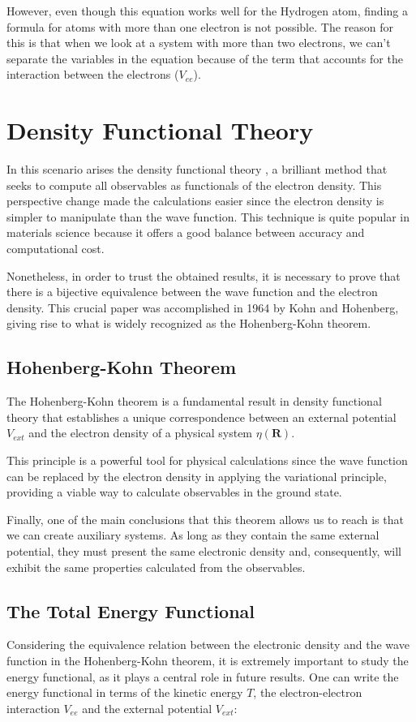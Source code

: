 However, even though this equation works well for the Hydrogen atom, finding a formula for atoms with more than one electron is not possible. The reason for this is that when we look at a system with more than two electrons, we can't separate the variables in the equation because of the term that accounts for the interaction between the electrons ($V_{ee}$).

\section{Density Functional Theory}
In this scenario arises the density functional theory  \cite{PhysRev.136.B864}, a brilliant method that seeks to compute all observables as functionals of the electron density. This perspective change made the calculations easier since the electron density is simpler to manipulate than the wave function. This technique is quite popular in materials science because it offers a good balance between accuracy and computational cost.

Nonetheless, in order to trust the obtained results, it is necessary to prove that there is a bijective equivalence between the wave function and the electron density. This crucial paper was accomplished in 1964 by Kohn and Hohenberg\cite{PhysRev.136.B864}, giving rise to what is widely recognized as the Hohenberg-Kohn theorem.

\subsection{Hohenberg-Kohn Theorem}
The Hohenberg-Kohn theorem \cite{PhysRev.136.B864} is a fundamental result in density functional theory that establishes a unique correspondence between an external potential $V_{ext}$ and the electron density of a physical system $\eta (\textbf{R})$. 

This principle is a powerful tool for physical calculations since the wave function can be replaced by the electron density in applying the variational principle, providing a viable way to calculate observables in the ground state.

Finally, one of the main conclusions that this theorem allows us to reach is that we can create auxiliary systems. As long as they contain the same external potential, they must present the same electronic density and, consequently, will exhibit the same properties calculated from the observables.

\subsection{The Total Energy Functional}
Considering the equivalence relation between the electronic density and the wave function in the Hohenberg-Kohn theorem, it is extremely important to study the energy functional, as it plays a central role in future results. One can write the energy functional in terms of the kinetic energy $T$, the electron-electron interaction $V_{ee}$ and the external potential $V_{ext}$:


